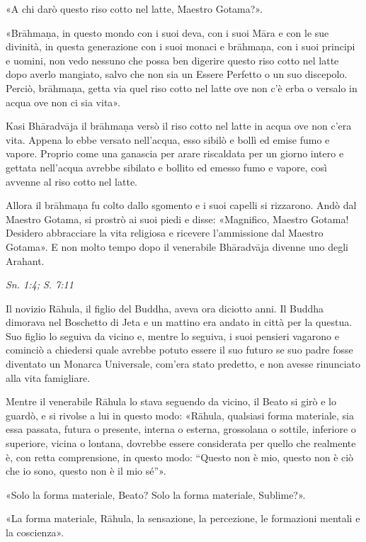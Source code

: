 «A chi darò questo riso cotto nel latte, Maestro Gotama?».


«Brāhmaṇa, in questo mondo con i suoi deva, con i suoi Māra e con le sue
divinità, in questa generazione con i suoi monaci e brāhmaṇa, con i suoi
principi e uomini, non vedo nessuno che possa ben digerire questo riso
cotto nel latte dopo averlo mangiato, salvo che non sia un Essere
Perfetto o un suo discepolo. Perciò, brāhmaṇa, getta via quel riso cotto
nel latte ove non c’è erba o versalo in acqua ove non ci sia vita».


Kasi Bhāradvāja il brāhmaṇa versò il riso cotto nel latte in acqua ove
non c’era vita. Appena lo ebbe versato nell’acqua, esso sibilò e bollì
ed emise fumo e vapore. Proprio come una ganascia per arare riscaldata
per un giorno intero e gettata nell’acqua avrebbe sibilato e bollito ed
emesso fumo e vapore, così avvenne al riso cotto nel latte.


Allora il brāhmaṇa fu colto dallo sgomento e i suoi capelli si
rizzarono. Andò dal Maestro Gotama, si prostrò ai suoi piedi e disse:
«Magnifico, Maestro Gotama! Desidero abbracciare la vita religiosa e
ricevere l’ammissione dal Maestro Gotama». E non molto tempo dopo il
venerabile Bhāradvāja divenne uno degli Arahant.


\emph{Sn. 1:4; S. 7:11}


 Il novizio Rāhula, il figlio del Buddha, aveva ora
diciotto anni. Il Buddha dimorava nel Boschetto di Jeta e un mattino era
andato in città per la questua. Suo figlio lo seguiva da vicino e,
mentre lo seguiva, i suoi pensieri vagarono e cominciò a chiedersi quale
avrebbe potuto essere il suo futuro se suo padre fosse diventato un
Monarca Universale, com’era stato predetto, e non avesse rinunciato alla
vita famigliare.


 Mentre il venerabile Rāhula lo stava seguendo da vicino, il
Beato si girò e lo guardò, e si rivolse a lui in questo modo: «Rāhula,
qualsiasi forma materiale, sia essa passata, futura o presente, interna
o esterna, grossolana o sottile, inferiore o superiore, vicina o
lontana, dovrebbe essere considerata per quello che realmente è, con
retta comprensione, in questo modo: “Questo non è mio, questo non è ciò
che io sono, questo non è il mio sé”».


«Solo la forma materiale, Beato? Solo la forma materiale, Sublime?».


«La forma materiale, Rāhula, la sensazione, la percezione, le formazioni
mentali e la coscienza».



